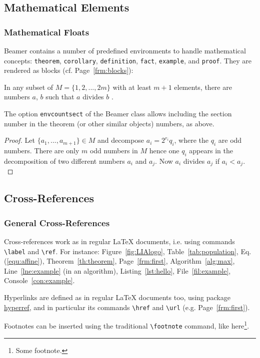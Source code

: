 \documentclass[10pt,    %
    english,            %
    xcolor=table,       %
    envcountsect,       %
    aspectratio=43      %
]{beamer}
\begin{document}
\subsection{Mathematical Elements}
\begin{frame}
    \frametitle{Mathematical Floats}
    
    Beamer contains a number of predefined environments to handle mathematical concepts: \texttt{theorem}, \texttt{corollary}, \texttt{definition}, \texttt{fact}, \texttt{example}, and \texttt{proof}. They are rendered as blocks (cf. Page~\ref{frm:blocks}):
    
    \begin{theorem}
        In any subset of $M = \{1, 2, ... , 2m\}$ with at least $m + 1$ elements, there are numbers $a$, $b$ such that $a$ divides $b$ \cite{Neunhauserer2013}.
        \label{th:theorem}
    \end{theorem} 
    
    The option \texttt{envcountsect} of the Beamer class allows including the section number in the theorem (or other similar objects) numbers, as above.
    
    \begin{proof}
         Let $\{a_1, . . . , a_{m+1}\} \in M$ and decompose $a_i = 2^{r_i} q_i$, where the $q_i$ are odd numbers. There are only $m$ odd numbers in $M$ hence one $q_i$ appears in the decomposition of two different numbers $a_i$ and $a_j$. Now $a_i$ divides $a_j$ if $a_i < a_j$.
        \label{th:proof}
    \end{proof} 
\end{frame}
    




\subsection{Cross-References}
\begin{frame}
    \frametitle{General Cross-References}
    
    Cross-references work as in regular \LaTeX{} documents, i.e. using commands \texttt{\textbackslash{}label} and \texttt{\textbackslash{}ref}. For instance: Figure~\ref{fig:LIAlogo}, Table~\ref{tab:population}, Eq.(\ref{equ:affine}), Theorem~\ref{th:theorem}, Page~\ref{frm:first}, Algorithm~\ref{alg:max}, Line~\ref{lne:example} (in an algorithm), Listing~\ref{lst:hello}, File~\ref{fil:example}, Console~\ref{con:example}.
    
    \vspace{0.25cm}
    Hyperlinks are defined as in regular \LaTeX{} documents too, using package \href{https://ctan.org/pkg/hyperref?lang=en}{hyperref}, and in particular its commands \texttt{\textbackslash{}href} and \texttt{\textbackslash{}url} (e.g. Page~\ref{frm:first}).

    \vspace{0.25cm}
    Footnotes can be inserted using the traditional \texttt{\textbackslash{}footnote} command, like here\footnote{Some footnote.}.
\end{frame}
\end{document}
